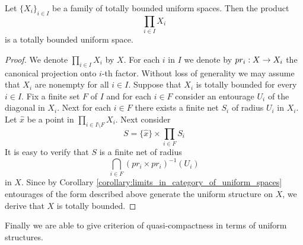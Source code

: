 \begin{theorem}\label{theorem:product_of_totally_bounded_spaces_is_totally_bounded}
	Let $\{X_i\}_{i \in I}$ be a family of totally bounded uniform spaces. Then the product
	$$\prod_{i \in I}X_i$$
	is a totally bounded uniform space.
\end{theorem}
\begin{proof}
	We denote $\prod_{i \in I}X_i$ by $X$. For each $i$ in $I$ we denote by $pr_i:X\rightarrow X_i$ the canonical projection onto $i$-th factor. Without loss of generality we may assume that $X_i$ are nonempty for all $i \in I$. Suppose that $X_i$ is totally bounded for every $i \in I$. Fix a finite set $F$ of $I$ and for each $i \in F$ consider an entourage $U_i$ of the diagonal in $X_i$. Next for each $i \in F$ there exists a finite net $S_i$ of radius $U_i$ in $X_i$. Let $\hat{x}$ be a point in $\prod_{i \in I\setminus F}X_i$. Next consider
	$$S = \{\hat{x}\}\times \prod_{i \in F}S_i$$
	It is easy to verify that $S$ is a finite net of radius
	$$\bigcap_{i \in F}\left(pr_i\times pr_i\right)^{-1}(U_i)$$
	in $X$. Since by Corollary \ref{corollary:limits_in_category_of_uniform_spaces} entourages of the form described above generate the uniform structure on $X$, we derive that $X$ is totally bounded.
\end{proof}
\noindent
Finally we are able to give criterion of quasi-compactness in terms of uniform structures.

